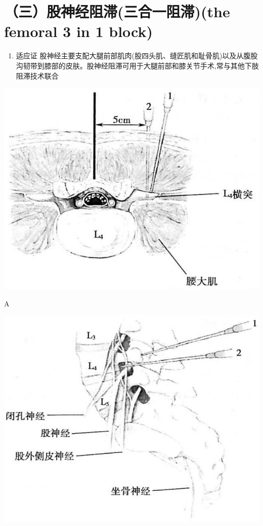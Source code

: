 \documentclass[10pt]{article}
\begin{document}
\section*{（三）股神经阻滞(三合一阻滞)(the femoral 3 in 1 block)}
\begin{enumerate}
  \item 适应证 股神经主要支配大腿前部肌肉(股四头肌、缝匠肌和耻骨肌)以及从腹股沟韧带到膝部的皮肤。股神经阻滞可用于大腿前部和膝关节手术,常与其他下肢阻滞技术联合
\end{enumerate}

\begin{center}
\includegraphics[max width=\textwidth]{2024_07_09_002a177993bd97d1d6d7g-056(2)}
\end{center}

A

\begin{center}
\includegraphics[max width=\textwidth]{2024_07_09_002a177993bd97d1d6d7g-056(1)}
\end{center}
\end{document}
